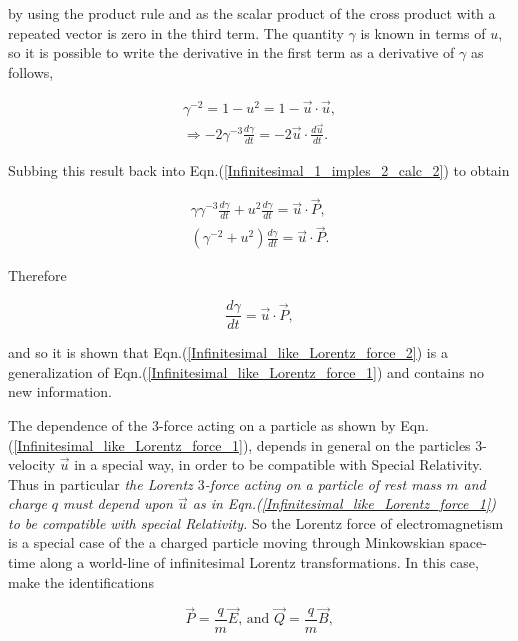\noindent by using the product rule and as the scalar product of the cross product with a repeated vector is zero in the third term. The quantity $\gamma$ is known in terms of $u$, so it is possible to write the derivative in the first term as a derivative of $\gamma$ as follows,

\begin{eqnarray*} 
\gamma^{-2} = 1 - u^{2} = 1- \vec{u} \cdot \vec{u}, \\
\Rightarrow -2 \gamma^{-3} \frac{d\gamma}{dt} = - 2 \vec{u} \cdot \frac{d \vec{u}}{dt}.
\end{eqnarray*}

\noindent Subbing this result back into Eqn.(\ref{Infinitesimal_1_imples_2_calc_2}) to obtain

\begin{eqnarray*} 
\gamma \gamma^{-3} \frac{d\gamma}{dt} + u^2 \frac{d\gamma}{dt} = \vec{u} \cdot \vec{P}, \\
(\gamma^{-2} + u^2) \frac{d\gamma}{dt} = \vec{u} \cdot \vec{P}.
\end{eqnarray*} 

Therefore

\begin{equation*}
\frac{d\gamma}{dt} =  \vec{u} \cdot \vec{P},
\end{equation*}

and so it is shown that Eqn.(\ref{Infinitesimal_like_Lorentz_force_2}) is a generalization of Eqn.(\ref{Infinitesimal_like_Lorentz_force_1}) and contains no new information. 

The dependence of the $3$-force acting on a particle as shown by Eqn.(\ref{Infinitesimal_like_Lorentz_force_1}), depends in general on the particles $3$-velocity $\vec{u}$ in a special way, in order to be compatible with Special Relativity. Thus in particular \textit{the Lorentz $3$-force acting on a particle of rest mass $m$ and charge $q$ must depend upon $\vec{u}$ as in Eqn.(\ref{Infinitesimal_like_Lorentz_force_1}) to be compatible with special Relativity.} So the Lorentz force of electromagnetism is a special case of the a charged particle moving through Minkowskian space-time along a world-line of infinitesimal Lorentz transformations. In this case, make the identifications

\begin{equation}\label{Infinitesimal_P_Q_interms_E_B} 
\vec{P} = \frac{q}{m} \vec{E} \text{, and  } \vec{Q} = \frac{q}{m}\vec{B},
\end{equation} 

